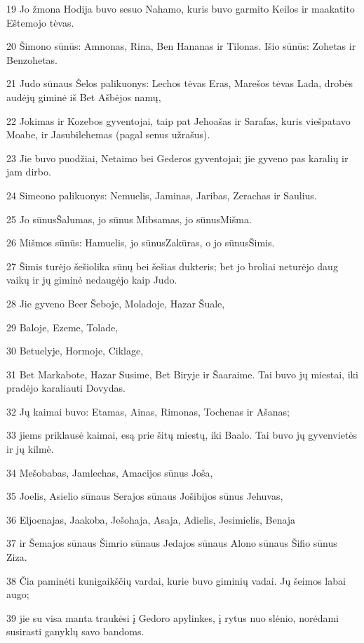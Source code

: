 \par 19 Jo žmona Hodija buvo sesuo Nahamo, kuris buvo garmito Keilos ir maakatito Eštemojo tėvas. 
\par 20 Šimono sūnūs: Amnonas, Rina, Ben Hananas ir Tilonas. Išio sūnūs: Zohetas ir Benzohetas. 
\par 21 Judo sūnaus Šelos palikuonys: Lechos tėvas Eras, Marešos tėvas Lada, drobės audėjų giminė iš Bet Ašbėjos namų, 
\par 22 Jokimas ir Kozebos gyventojai, taip pat Jehoašas ir Sarafas, kuris viešpatavo Moabe, ir Jasubilehemas (pagal senus užrašus). 
\par 23 Jie buvo puodžiai, Netaimo bei Gederos gyventojai; jie gyveno pas karalių ir jam dirbo. 
\par 24 Simeono palikuonys: Nemuelis, Jaminas, Jaribas, Zerachas ir Saulius. 
\par 25 Jo sūnus­Šalumas, jo sūnus­ Mibsamas, jo sūnus­Mišma. 
\par 26 Mišmos sūnūs: Hamuelis, jo sūnus­Zakūras, o jo sūnus­Šimis. 
\par 27 Šimis turėjo šešiolika sūnų bei šešias dukteris; bet jo broliai neturėjo daug vaikų ir jų giminė nedaugėjo kaip Judo. 
\par 28 Jie gyveno Beer Šeboje, Moladoje, Hazar Šuale, 
\par 29 Baloje, Ezeme, Tolade, 
\par 30 Betuelyje, Hormoje, Ciklage, 
\par 31 Bet Markabote, Hazar Susime, Bet Biryje ir Šaaraime. Tai buvo jų miestai, iki pradėjo karaliauti Dovydas. 
\par 32 Jų kaimai buvo: Etamas, Ainas, Rimonas, Tochenas ir Ašanas; 
\par 33 jiems priklausė kaimai, esą prie šitų miestų, iki Baalo. Tai buvo jų gyvenvietės ir jų kilmė. 
\par 34 Mešobabas, Jamlechas, Amacijos sūnus Joša, 
\par 35 Joelis, Asielio sūnaus Serajos sūnaus Jošibijos sūnus Jehuvas, 
\par 36 Eljoenajas, Jaakoba, Ješohaja, Asaja, Adielis, Jesimielis, Benaja 
\par 37 ir Šemajos sūnaus Šimrio sūnaus Jedajos sūnaus Alono sūnaus Šifio sūnus Ziza. 
\par 38 Čia paminėti kunigaikščių vardai, kurie buvo giminių vadai. Jų šeimos labai augo; 
\par 39 jie su visa manta traukėsi į Gedoro apylinkes, į rytus nuo slėnio, norėdami susirasti ganyklų savo bandoms. 

